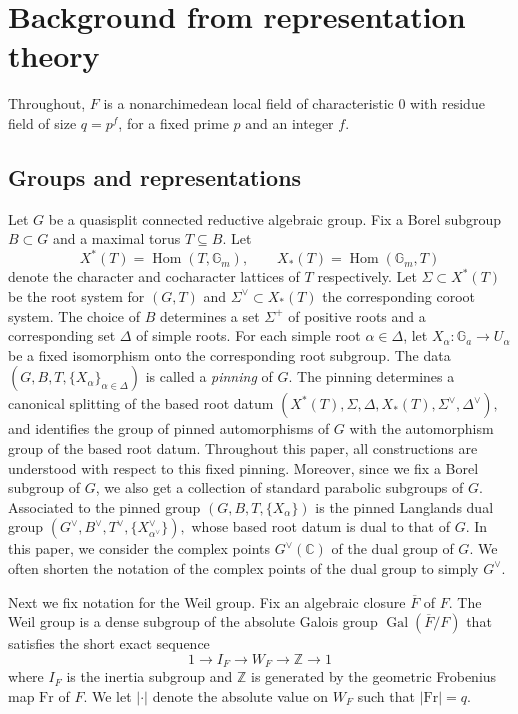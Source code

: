 \documentclass[11pt,letterpaper]{amsart}
\newcommand{\Z}{\mathbb{Z}}
\newcommand{\dualgroup}[1]{{#1}^\vee}
\newcommand{\Fr}{\mathrm{Fr}}
\newcommand{\CC}{\mathbb{C}}
\DeclareMathOperator{\Gal}{Gal}
\renewcommand{\1}{\mathbbm{1}}
\numberwithin{equation}{section}
\begin{document}
{\section{Background from representation theory}
Throughout, $F$ is a nonarchimedean local field of characteristic $0$ with residue field of size $q=p^f$, for a fixed prime $p$ and an integer $f$.
\subsection{Groups and representations}\label{Groups and representations}
Let $G$ be a quasisplit connected reductive algebraic group. Fix a Borel subgroup $B \subset G$ and a maximal torus $T \subseteq B$. 
Let \[X^*(T)=\operatorname{Hom}(T,\mathbb{G}_m),\qquad X_*(T)=\operatorname{Hom}(\mathbb{G}_m,T)\] denote the character and cocharacter lattices of $T$ respectively. 
Let $\Sigma \subset X^*(T)$
be the root system for $(G,T)$ and $\dualgroup{\Sigma} \subset X_*(T)$
the corresponding coroot system. The choice of $B$ determines a set $\Sigma^+$ of positive roots
and a corresponding set $\Delta$ of simple roots. For each simple root $\alpha\in\Delta$, let
$
X_\alpha:\mathbb{G}_a\longrightarrow U_\alpha
$
be a fixed isomorphism onto the corresponding root subgroup. The data
$
(G,B,T,\{X_\alpha\}_{\alpha\in\Delta})
$
is called a \emph{pinning} of $G$. The pinning determines a canonical splitting of the based root datum
$
(X^*(T),\Sigma,\Delta,X_*(T),\dualgroup{\Sigma},\dualgroup{\Delta}),
$
and identifies the group of pinned automorphisms of $G$ with the automorphism group of the based root datum. Throughout this paper, all constructions are understood with respect to this fixed pinning. Moreover, since we fix a Borel subgroup of $G$, we also get a collection of standard parabolic subgroups of $G$. Associated to the pinned group $(G,B,T,\{X_\alpha\})$ is the pinned Langlands dual group
$(\dualgroup{G},\dualgroup{B},\dualgroup{T},\{X^\vee_{\alpha^\vee}\}),
$ whose based root datum is dual to that of $G$. In this paper, we consider the complex points $\dualgroup{G}(\CC)$ of the dual group of $G$. {We often shorten the notation of the complex points of the dual group to simply $\dualgroup{G}$.}


Next we fix notation for the Weil group. Fix an algebraic closure $\overline{F}$ of $F$. The Weil group is a dense subgroup of the absolute Galois group $\Gal(\overline{F}/F)$ that satisfies the short exact sequence
\[1 \rightarrow I_F\rightarrow W_F \rightarrow \mathbb{Z} \rightarrow 1\]
where $I_F$ is the inertia subgroup and
$\Z$ is generated by the geometric Frobenius map $\Fr$ of $F$. We let $|\cdot|$ denote the absolute value on $W_F$ such that $|\Fr|=q$.

}
\end{document}
